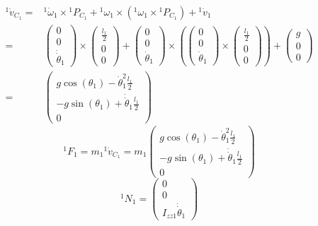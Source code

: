 \documentclass[10pt,a4paper]{article}
\begin{document}
\begin{align*}
  {}^{1}\dot{v}_{C_{1}} = & {}^{1}\dot{\omega}_{1} \times {}^{1}P_{C_{1}} + {}^{1}\omega_{1} \times \left( {}^{1}\omega_{1} \times {}^{1}P_{C_{1}} \right) + {}^{1}\dot{v}_{1}\\
  = & \begin{pmatrix}
    0\\0\\\dot{\dot{\theta}}_{1}
  \end{pmatrix} \times \begin{pmatrix}
    \frac{l_{1}}{2}\\0\\0
  \end{pmatrix} + \begin{pmatrix}
    0\\0\\\dot{\theta}_{1}
  \end{pmatrix} \times \left( \begin{pmatrix}
    0\\0\\\dot{\theta}_{1}
  \end{pmatrix} \times \begin{pmatrix}
    \frac{l_{1}}{2}\\0\\0
  \end{pmatrix} \right) + \begin{pmatrix}
  g\\0\\0
\end{pmatrix}\\
  = & \begin{pmatrix}
    g\cos(\theta_{1}) - \dot{\theta}_{1}^{2} \frac{l_{1}}{2}\\
    -g\sin(\theta_{1}) + \dot{\dot{\theta}}_{1} \frac{l_{1}}{2}\\
    0
  \end{pmatrix}
\end{align*}
\begin{equation*}
  {}^{1}F_{1} = m_{1} {}^{1}\dot{v}_{C_{1}} = m_{1} \begin{pmatrix}
    g\cos(\theta_{1}) - \dot{\theta}_{1}^{2} \frac{l_{1}}{2}\\
    -g\sin(\theta_{1}) + \dot{\dot{\theta}}_{1} \frac{l_{1}}{2}\\
    0
  \end{pmatrix}
\end{equation*}
\begin{equation*}
  {}^{1}N_{1} = \begin{pmatrix}
    0\\0\\I_{zz1}\dot{\dot{\theta}}_{1}
  \end{pmatrix}
\end{equation*}
\end{document}
